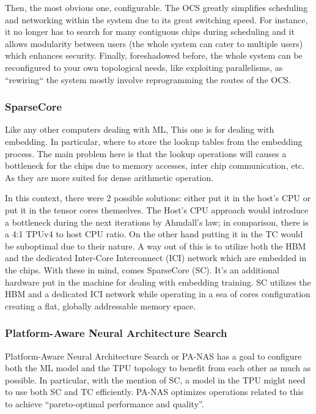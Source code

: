 \documentclass[conference]{IEEEtran}
\begin{document}
    Then, the most obvious one, configurable.
    The OCS greatly simplifies scheduling and networking within the system due to its great switching speed.
    For instance, it no longer has to search for many contiguous chips during scheduling and it allows modularity between users (the whole system can cater to multiple users) which enhances security.
    Finally, foreshadowed before, the whole system can be reconfigured to your own topological needs, like exploiting parallelisms, as ``rewiring`` the system mostly involve reprogramming the routes of the OCS\@.

    \subsubsection{SparseCore}
    Like any other computers dealing with ML, This one is for dealing with embedding.
    In particular, where to store the lookup tables from the embedding process.
    The main problem here is that the lookup operations will causes a bottleneck for the chips due to memory accesses, inter chip communication, etc.
    As they are more suited for dense arithmetic operation.

    In this context, there were 2 possible solutions: either put it in the host’s CPU or put it in the tensor cores themselves.
    The Host’s CPU approach would introduce a bottleneck during the next iterations by Ahmdall’s law; in comparison, there is a 4:1 TPUv4 to host CPU ratio.
    On the other hand putting it in the TC would be suboptimal due to their nature.
    A way out of this is to utilize both the HBM and the dedicated Inter-Core Interconnect (ICI) network which are embedded in the chips.
    With these in mind, comes SparseCore (SC).
    It’s an additional hardware put in the machine for dealing with embedding training.
    SC utilizes the HBM and a dedicated ICI network while operating in a sea of cores configuration creating a flat, globally addressable memory space.

    \subsubsection{Platform-Aware Neural Architecture Search}
    Platform-Aware Neural Architecture Search or PA-NAS has a goal to configure both the ML model and the TPU topology to benefit from each other as much as possible.
    In particular, with the mention of SC, a model in the TPU might need to use both SC and TC efficiently.
    PA-NAS optimizes operations related to this to achieve “pareto-optimal performance and quality”.
\end{document}
